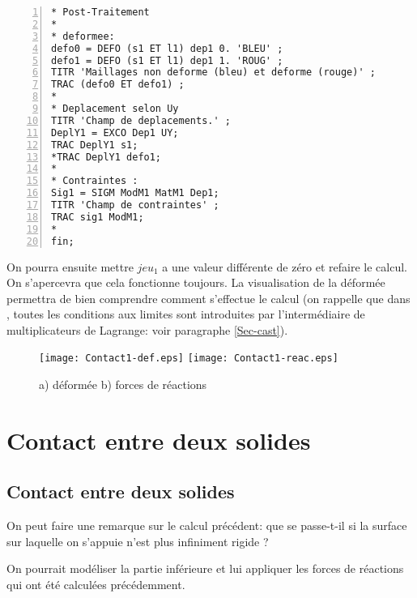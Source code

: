 \color{gris}\scriptsize
\begin{multicols}{2}
\begin{Verbatim}[numbers=left,numbersep=3pt,firstnumber=last]
* Post-Traitement
*
* deformee:
defo0 = DEFO (s1 ET l1) dep1 0. 'BLEU' ;
defo1 = DEFO (s1 ET l1) dep1 1. 'ROUG' ;
TITR 'Maillages non deforme (bleu) et deforme (rouge)' ;
TRAC (defo0 ET defo1) ;
*
* Deplacement selon Uy
TITR 'Champ de deplacements.' ;
DeplY1 = EXCO Dep1 UY;
TRAC DeplY1 s1;
*TRAC DeplY1 defo1;
*
* Contraintes :
Sig1 = SIGM ModM1 MatM1 Dep1;
TITR 'Champ de contraintes' ;
TRAC sig1 ModM1;
*
fin;
\end{Verbatim}
\end{multicols}
\color{black}\normalsize

\medskip
On pourra ensuite mettre $jeu_1$ a une valeur différente de zéro et refaire le calcul.
On s'apercevra que cela fonctionne toujours. La visualisation de la déformée permettra
de bien comprendre comment s'effectue le calcul (on rappelle que dans \castem, toutes 
les conditions aux limites sont introduites par l'intermédiaire de multiplicateurs de
Lagrange: voir paragraphe \ref{Sec-cast}).

\begin{figure}[ht]
   \texttt{[image: Contact1-def.eps]} \hfill 
   \texttt{[image: Contact1-reac.eps]}
   \caption{\label{Fig-Cont1} a) déformée b) %
forces de réactions}
\end{figure}













\medskip
\ifVersionAvecExemplesSepares
   \section{Contact entre deux solides}
\else
   \subsection{Contact entre deux solides}
\fi

On peut faire une remarque sur le calcul précédent: que se passe-t-il si la surface sur laquelle
on s'appuie n'est plus infiniment rigide ?

\medskip
On pourrait modéliser la partie inférieure et lui appliquer les forces de réactions qui ont été
calculées précédemment.


